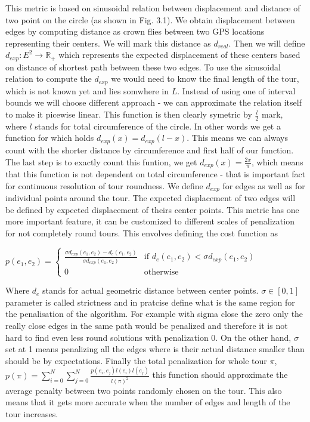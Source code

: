 \documentclass{ctuthesis}
\begin{document}
This metric is based on sinusoidal relation between displacement and distance of two point on the circle (as shown in Fig. 3.1). We obtain displacement between edges by computing distance as crown flies between two GPS locations representing their centers. We will mark this distance as \(d_{real}\). Then we will define \(d_{exp}: E^2 \rightarrow \mathbb{R_+}\) which represents the expected displacement of these centers based on distance of shortest path between these two edges. To use the sinusoidal relation to compute the \(d_{exp}\) we would need to know the final length of the tour, which is not known yet and lies somwhere in \(L\). Instead of using one of interval bounds we will choose different approach - we can approximate the relation itself to make it picewise linear. This function is then clearly symetric by \(\frac {l} {2}\) mark, where \(l\) stands for total circumference of the circle. In other words we get a function for which holds \(d_{exp}(x) = d_{exp}(l-x)\). This means we can always count with the shorter distance by circumference and first half of our function. The last step is to exactly count this funtion, we get \(d_{exp}(x)=\frac{2 x} {\pi}\), which means that this function is not dependent on total circumference - that is important fact for continuous resolution of tour roundness.
We define \(d_{exp}\) for edges as well as for individual points around the tour. The expected displacement of two edges will be defined by expected displacement of theirs center points. This metric has one more important feature, it can be customized to different scales of penalization for not completely round tours. This envolves defining the cost function as \par

\(
	p(e_1, e_2) = \begin{cases}
		\frac 
			{\sigma d_{exp}(e_1, e_2)-d_e(e_1, e_2)}
 			{\sigma d_{exp}(e_1, e_2)}
 		& \text{if } d_e(e_1, e_2) < \sigma d_{exp}(e_1, e_2) \\
		0  & \text{otherwise} 
	\end{cases}
\) \par
Where \(d_e\) stands for actual geometric distance between center points.  \(\sigma \in [0, 1]\) parameter is called strictness and in pratcise define what is the same region for the penalisation of the algorithm. For example with sigma close the zero only the really close edges in the same path would be penalized and therefore it is not hard to find even less round solutions with penalization 0. On the other hand, \(\sigma\) set at 1 means penalizing all the edges where is their actual distance smaller than should be by expectations. Finally the total penalization for whole tour \(\pi\), \(p(\pi) = \sum_{i=0}^{N} \sum_{j=0}^{N}\frac{p(e_i, e_j)l(e_i)l(e_j)}{l(\pi)^2}\) this function should approximate the average penalty between two points randomly chosen on the tour. This also means that it gets more accurate when the number of edges and length of the tour increases.
\end{document}
